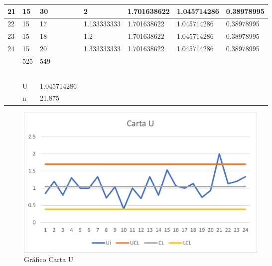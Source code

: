 \documentclass{article}
\theoremstyle{mytheoremstyle}
\theoremstyle{mytheoremstyle}
\theoremstyle{myproblemstyle}
\begin{document}
\begin{table}[!ht]
\begin{tabular}{|l|l|l|l|l|l|l|}
        21 & 15 & 30 & 2 & 1.701638622 & 1.045714286 & 0.38978995 \\ \hline
        22 & 15 & 17 & 1.133333333 & 1.701638622 & 1.045714286 & 0.38978995 \\ \hline
        23 & 15 & 18 & 1.2 & 1.701638622 & 1.045714286 & 0.38978995 \\ \hline
        24 & 15 & 20 & 1.333333333 & 1.701638622 & 1.045714286 & 0.38978995 \\ \hline
        ~ & 525 & 549 & ~ & ~ & ~ & ~ \\ \hline
        ~ & ~ & ~ & ~ & ~ & ~ & ~ \\ \hline
        ~ & U & 1.045714286 & ~ & ~ & ~ & ~ \\ \hline
        ~ & n & 21.875 \\ \hline
    \end{tabular}
\end{table}
\begin{figure}[H]
	\centering
	\includegraphics[width=0.6\textwidth]{GrafU.png}
	\caption[short]{Gráfico Carta U}
	\label{fig:imagen2}
  \end{figure}
  
\nocite{*}

\end{document}
